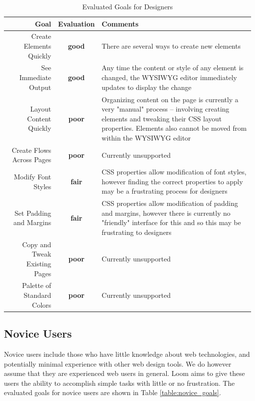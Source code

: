 \documentclass[conference, letterpaper]{IEEEtran}
\begin{document}
\begin{table}[!t]
  \renewcommand{\arraystretch}{1.3}
  \caption{Evaluated Goals for Designers}
  \label{table:designer_goals}
  \centering
  \begin{tabular}{|r|c|p{8cm}|}
    \hline
    Goal & Evaluation & Comments \\
    \hline \hline
    Create Elements Quickly & \textbf{\color{ForestGreen}good} & There are several ways to create new elements \\
    \hline
    See Immediate Output & \textbf{\color{ForestGreen}good} & Any time the content or style of any element is changed, the WYSIWYG editor immediately updates to display the change \\
    \hline
    Layout Content Quickly & \textbf{\color{Red}poor} & Organizing content on the page is currently a very "manual" process -- involving creating elements and tweaking their CSS layout properties. Elements also cannot be moved from within the WYSIWYG editor \\
    \hline
    Create Flows Across Pages & \textbf{\color{Red}poor} & Currently unsupported \\
    \hline
    Modify Font Styles & \textbf{\color{Dandelion}fair} & CSS properties allow modification of font styles, however finding the correct properties to apply may be a frustrating process for designers \\
    \hline
    Set Padding and Margins & \textbf{\color{Dandelion}fair} & CSS properties allow modification of padding and margins, however there is currently no "friendly" interface for this and so this may be frustrating to designers \\
    \hline
    Copy and Tweak Existing Pages & \textbf{\color{Red}poor} & Currently unsupported \\
    \hline
    Palette of Standard Colors & \textbf{\color{Red}poor} & Currently unsupported \\
    \hline
  \end{tabular}
\end{table}

\subsection{Novice Users}
Novice users include those who have little knowledge about web technologies, and potentially minimal experience with other web design tools. We do however assume that they are experienced web users in general. Loom aims to give these users the ability to accomplish simple tasks with little or no frustration. The evaluated goals for novice users are shown in Table \ref{table:novice_goals}.
\end{document}
